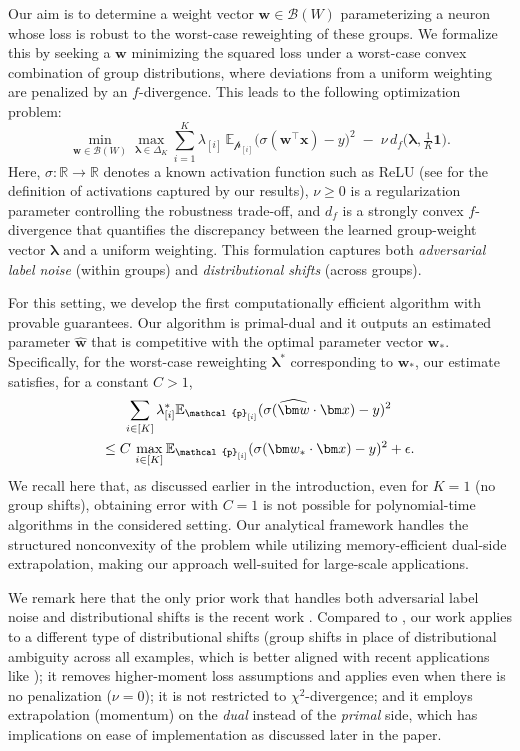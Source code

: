 \documentclass[11pt]{article}
\newcounter{thm}
\numberwithin{thm}{section}
\theoremstyle{plain}
\theoremstyle{definition}
\theoremstyle{remark} \newtheorem{remark}[thm]{Remark}
\def\vlambda{{\bm{\lambda}}}
\def\vw{{\bm{w}}}
\def\vx{{\bm{x}}}
\def\pp{{\mathcal{p}}}
\def\cB{{\mathcal{B}}}
\newcommand{\E}{\mathbb{E}}
\newcommand{\R}{\mathbb{R}}
\newcommand{\lambdai}{\lambda_{[i]}}
\def\mathbf{\bm}
\begin{document}
Our aim is to determine a weight vector \(\vw\in\cB(W)\) parameterizing a neuron  
whose loss is robust to the worst-case reweighting of these groups. 
We formalize this by seeking a \(\vw\) 
minimizing the squared loss under a worst-case 
convex combination of group distributions, 
where deviations from a uniform weighting are penalized by an \(f\)-divergence. 
This leads to the following optimization problem:
\[
\min_{\vw \in \cB(W)}\max_{\vlambda\in\Delta_K}
\sum_{i=1}^K\lambdai\,\E_{\pp_{[i]}}\bigl(\sigma(\vw^\top\vx)-y\bigr)^2
\;-\;\nu\,d_f\!\big(\vlambda,\tfrac1K\mathbf1\big).
\]
Here, \(\sigma:\R\to\R\) denotes a known activation function such as ReLU (see  for the definition of activations captured by our results), 
\(\nu \ge 0\) is a regularization parameter controlling the robustness trade-off, 
and \(d_f\) is a strongly convex \(f\)-divergence that quantifies the discrepancy between 
the learned group-weight vector \(\vlambda\) and a uniform weighting. 
This formulation captures both 
\emph{adversarial label noise} (within groups) 
and \emph{distributional shifts} (across groups).

For this setting, we develop the first computationally efficient algorithm with provable guarantees. 
Our algorithm is primal-dual and it outputs an estimated parameter \(\widehat\vw\) 
that is competitive with the optimal parameter vector \(\vw_*\). 
Specifically, for the worst-case reweighting \(\vlambda^*\) 
corresponding to \(\vw_*\), our estimate satisfies, for a constant $C > 1$,
\begin{equation}\notag
    \begin{aligned}
        &\; \sum_{i \in [K]} \lambdai^* \E_{\pp_{[i]}}(\sigma(\widehat{\mathbf w}\cdot\mathbf x)-y)^2\\
        \le \; &C\,\max_{i \in [K]} \E_{\pp_{[i]}}(\sigma(\mathbf w_*\cdot\mathbf x)-y)^2 + \epsilon.
    \end{aligned}
\end{equation}
We recall here that, as discussed earlier in the introduction, even for $K=1$ (no group shifts), obtaining error with $C=1$ is not possible for polynomial-time algorithms in the considered setting. 
Our analytical framework handles the structured nonconvexity of the problem 
while utilizing memory-efficient dual-side extrapolation, 
making our approach well-suited for large-scale applications.

We remark here that the only prior work that handles both adversarial label noise and distributional shifts is the recent work \citep{Li2024shifts}. Compared to \citep{Li2024shifts}, our work applies to a different type of distributional shifts (group shifts in place of distributional ambiguity across all examples, which is better aligned with recent applications like \citep{xie2023doremi,xia2024shearedllamaacceleratinglanguage}); it removes higher-moment loss assumptions and applies even when there is no penalization ($\nu = 0$); it is not restricted to $\chi^2$-divergence; and it employs extrapolation (momentum) on the \emph{dual} instead of the \emph{primal} side, which has implications on ease of implementation as discussed later in the paper.  
\end{document}
